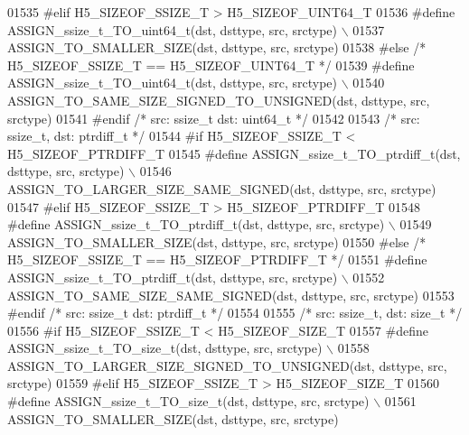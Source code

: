 \begin{DoxyCode}
01535 \textcolor{preprocessor}{#elif H5\_SIZEOF\_SSIZE\_T > H5\_SIZEOF\_UINT64\_T}
01536 \textcolor{preprocessor}{    #define ASSIGN\_ssize\_t\_TO\_uint64\_t(dst, dsttype, src, srctype) \(\backslash\)}
01537 \textcolor{preprocessor}{        ASSIGN\_TO\_SMALLER\_SIZE(dst, dsttype, src, srctype)}
01538 \textcolor{preprocessor}{#else }\textcolor{comment}{/* H5\_SIZEOF\_SSIZE\_T == H5\_SIZEOF\_UINT64\_T */}\textcolor{preprocessor}{}
01539 \textcolor{preprocessor}{    #define ASSIGN\_ssize\_t\_TO\_uint64\_t(dst, dsttype, src, srctype) \(\backslash\)}
01540 \textcolor{preprocessor}{        ASSIGN\_TO\_SAME\_SIZE\_SIGNED\_TO\_UNSIGNED(dst, dsttype, src, srctype)}
01541 \textcolor{preprocessor}{#endif }\textcolor{comment}{/* src: ssize\_t dst: uint64\_t */}\textcolor{preprocessor}{}
01542 
01543 \textcolor{comment}{/* src: ssize\_t, dst: ptrdiff\_t */}
01544 \textcolor{preprocessor}{#if H5\_SIZEOF\_SSIZE\_T < H5\_SIZEOF\_PTRDIFF\_T}
01545 \textcolor{preprocessor}{    #define ASSIGN\_ssize\_t\_TO\_ptrdiff\_t(dst, dsttype, src, srctype) \(\backslash\)}
01546 \textcolor{preprocessor}{        ASSIGN\_TO\_LARGER\_SIZE\_SAME\_SIGNED(dst, dsttype, src, srctype)}
01547 \textcolor{preprocessor}{#elif H5\_SIZEOF\_SSIZE\_T > H5\_SIZEOF\_PTRDIFF\_T}
01548 \textcolor{preprocessor}{    #define ASSIGN\_ssize\_t\_TO\_ptrdiff\_t(dst, dsttype, src, srctype) \(\backslash\)}
01549 \textcolor{preprocessor}{        ASSIGN\_TO\_SMALLER\_SIZE(dst, dsttype, src, srctype)}
01550 \textcolor{preprocessor}{#else }\textcolor{comment}{/* H5\_SIZEOF\_SSIZE\_T == H5\_SIZEOF\_PTRDIFF\_T */}\textcolor{preprocessor}{}
01551 \textcolor{preprocessor}{    #define ASSIGN\_ssize\_t\_TO\_ptrdiff\_t(dst, dsttype, src, srctype) \(\backslash\)}
01552 \textcolor{preprocessor}{        ASSIGN\_TO\_SAME\_SIZE\_SAME\_SIGNED(dst, dsttype, src, srctype)}
01553 \textcolor{preprocessor}{#endif }\textcolor{comment}{/* src: ssize\_t dst: ptrdiff\_t */}\textcolor{preprocessor}{}
01554 
01555 \textcolor{comment}{/* src: ssize\_t, dst: size\_t */}
01556 \textcolor{preprocessor}{#if H5\_SIZEOF\_SSIZE\_T < H5\_SIZEOF\_SIZE\_T}
01557 \textcolor{preprocessor}{    #define ASSIGN\_ssize\_t\_TO\_size\_t(dst, dsttype, src, srctype) \(\backslash\)}
01558 \textcolor{preprocessor}{        ASSIGN\_TO\_LARGER\_SIZE\_SIGNED\_TO\_UNSIGNED(dst, dsttype, src, srctype)}
01559 \textcolor{preprocessor}{#elif H5\_SIZEOF\_SSIZE\_T > H5\_SIZEOF\_SIZE\_T}
01560 \textcolor{preprocessor}{    #define ASSIGN\_ssize\_t\_TO\_size\_t(dst, dsttype, src, srctype) \(\backslash\)}
01561 \textcolor{preprocessor}{        ASSIGN\_TO\_SMALLER\_SIZE(dst, dsttype, src, srctype)}

\end{DoxyCode}
